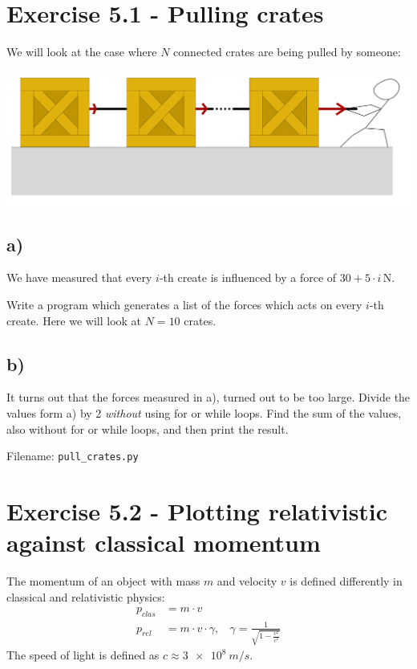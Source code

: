 \documentclass[10pt,a4paper]{article}
\begin{document}
\section*{Exercise 5.1 - Pulling crates}

We will look at the case where $N$ connected crates are being pulled by someone:
\begin{center}
	\includegraphics[scale=1]{fig_pull_crates-cp1.png}\\
\end{center}

\subsection*{a)}
We have measured that every $i$-th create is influenced by a force of $30 + 5\cdot i\,\si{\newton}$. 

Write a program which generates a list of the forces which acts on every $i$-th create. Here we will look at $N = 10$ crates. 

\subsection*{b)}
It turns out that the forces measured in a), turned out to be too large. Divide the values form a) by 2 \textit{without} using for or while loops. Find the sum of the values, also without for or while loops, and then print the result. 


Filename: \texttt{pull\_crates.py}



\section*{Exercise 5.2 - Plotting relativistic against classical momentum}
The momentum of an object with mass $m$ and velocity $v$ is defined differently in classical and relativistic physics:
\begin{align*}
p_{clas} &= m\cdot v
\\
p_{rel} &= m\cdot v\cdot \gamma, \ \ \ \ \gamma = \frac{1}{\sqrt{1-\frac{v^2}{c^2}}}
\end{align*}
The speed of light is defined as $c \approx \SI{3e8}{m/s}$.
\end{document}
